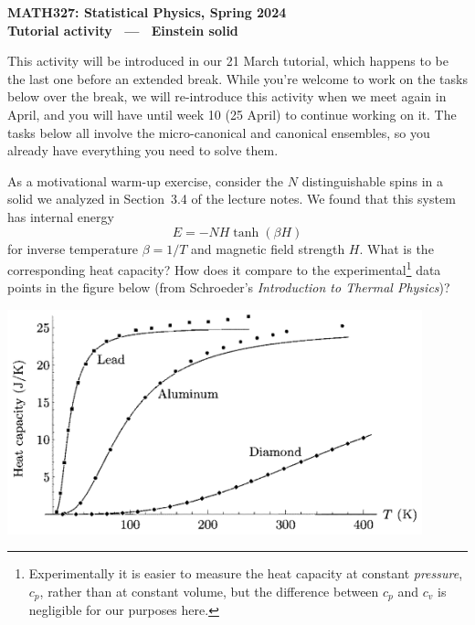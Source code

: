 \documentclass[12 pt]{article} %
\newcommand{\be}{\ensuremath{\beta} }
\begin{document}
\newcommand{\thisunit}{MATH327 Tutorial (Solid)}
\newcommand{\moddate}{Last modified 21 Mar.~2024}
\begin{center}
  {\Large \textbf{MATH327: Statistical Physics, Spring 2024}} \\[12 pt]
  {\Large \textbf{Tutorial activity \ --- \ Einstein solid}} \\[24 pt]
\end{center}

This activity will be introduced in our 21 March tutorial, which happens to be the last one before an extended break.
While you're welcome to work on the tasks below over the break, we will re-introduce this activity when we meet again in April, and you will have until week 10 (25 April) to continue working on it.
The tasks below all involve the micro-canonical and canonical ensembles, so you already have everything you need to solve them.

As a motivational warm-up exercise, consider the $N$ distinguishable spins in a solid we analyzed in Section~3.4 of the lecture notes.
We found that this system has internal energy
\begin{equation*}
  E = -NH\tanh(\be H)
\end{equation*}
for inverse temperature $\be = 1 / T$ and magnetic field strength $H$.
What is the corresponding heat capacity?
How does it compare to the experimental\footnote{Experimentally it is easier to measure the heat capacity at constant \textit{pressure}, $c_p$, rather than at constant volume, but the difference between $c_p$ and $c_v$ is negligible for our purposes here.} data points in the figure below (from Schroeder's \textit{Introduction to Thermal Physics})?

\begin{center}\includegraphics[width=0.9\textwidth]{figs/heat_cap.pdf}\end{center}
\end{document}
